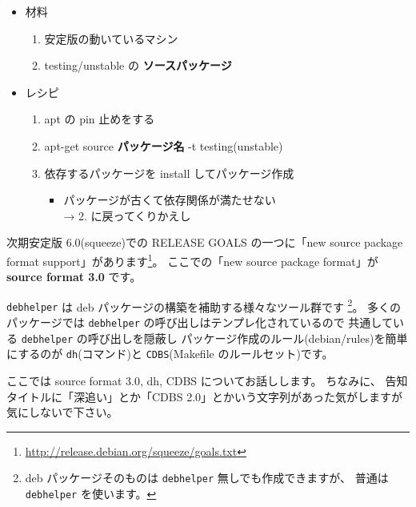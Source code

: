 \documentclass[mingoth,a4paper]{jsarticle}
\begin{document}
\begin{itemize}
\item 材料

\begin{enumerate}
\item 安定版の動いているマシン
\item testing/unstable の \textbf{ソースパッケージ}
\end{enumerate}

\item レシピ

\begin{enumerate}
\item apt の pin 止めをする
\item apt-get source \textbf{パッケージ名} -t testing(unstable)
\item 依存するパッケージを install してパッケージ作成

\begin{itemize}
\item パッケージが古くて依存関係が満たせない\\
→ 2. に戻ってくりかえし
\end{itemize}
\end{enumerate}
\end{itemize}



次期安定版 6.0(squeeze)での RELEASE GOALS の一つに「new source package format support」があります\footnote{\url{http://release.debian.org/squeeze/goals.txt}}。
ここでの「new source package format」が {\bf source format 3.0} です。
\vspace{1em}

{\tt debhelper} は deb パッケージの構築を補助する様々なツール群です%
\footnote{%
deb パッケージそのものは {\tt debhelper} 無しでも作成できますが、
普通は {\tt debhelper} を使います。}。
多くのパッケージでは {\tt debhelper} の呼び出しはテンプレ化されているので
共通している {\tt debhelper} の呼び出しを隠蔽し
パッケージ作成のルール(debian/rules)を簡単にするのが
{\tt dh}(コマンド)と {\tt CDBS}(Makefile のルールセット)です。
\vspace{1em}

ここでは source format 3.0, dh, CDBS についてお話しします。
ちなみに、
告知タイトルに「深追い」とか「CDBS 2.0」とかいう文字列があった気がしますが
気にしないで下さい。
\end{document}

